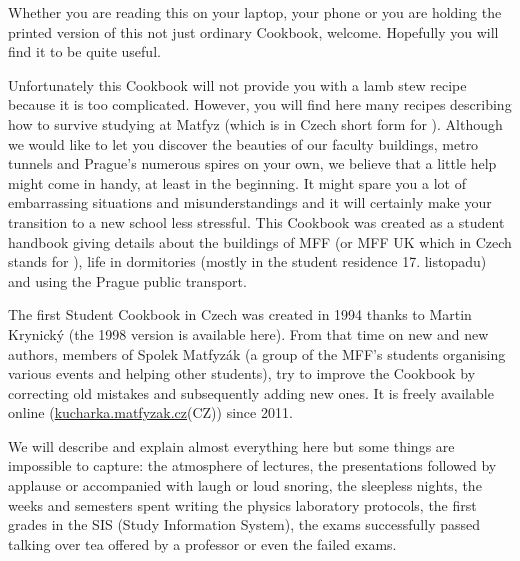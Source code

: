 \noindent Whether you are reading this on your laptop, your phone or you are
holding the printed version of this not just ordinary Cookbook, welcome.
Hopefully you will find it to be quite useful.


Unfortunately this Cookbook will not provide you with a lamb stew recipe because
it is too complicated.
However, you will find here many recipes describing how to survive studying at
Matfyz (which is in Czech short form for ).
Although we would like to let you discover the beauties of our faculty
buildings, metro tunnels and Prague's numerous spires on your own, we believe
that a little help might come in handy, at least in the beginning.
It might spare you a lot of embarrassing situations and misunderstandings and it
will certainly make your transition to a new school less stressful.
This Cookbook was created as a student handbook giving details about the
buildings of MFF (or MFF UK which in Czech stands for ), life in dormitories (mostly in
the student residence 17. listopadu) and using the Prague public transport.


The first Student Cookbook in Czech was created in 1994 thanks to Martin
Krynický (the 1998 version is available here).
From that time on new and new authors, members of Spolek Matfyzák (a group of
the MFF's students organising various events and helping other students), try to
improve the Cookbook by correcting old mistakes and subsequently adding new
ones.
It is freely available online (\url{kucharka.matfyzak.cz}(CZ)) since 2011.


We will describe and explain almost everything here but some things are
impossible to capture: the atmosphere of lectures, the presentations followed by
applause or accompanied with laugh or loud snoring, the sleepless nights, the
weeks and semesters spent writing the physics laboratory protocols, the first
grades in the SIS (Study Information System), the exams successfully passed
talking over tea offered by a professor or even the failed exams.